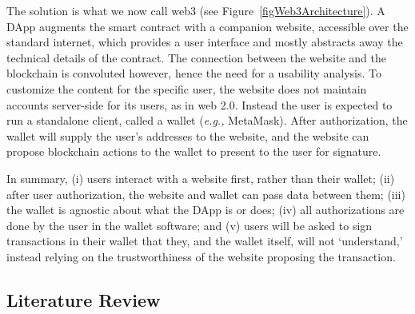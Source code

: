\documentclass[conference]{IEEEtran}
\begin{document}
The solution is what we now call web3 (see Figure~\ref{figWeb3Architecture}). A DApp augments the smart contract with a companion website, accessible over the standard internet, which provides a user interface and mostly abstracts away the technical details of the contract. The connection between the website and the blockchain is convoluted however, hence the need for a usability analysis. To customize the content for the specific user, the website does not maintain accounts server-side for its users, as in web 2.0. Instead the user is expected to run a standalone client, called a wallet (\textit{e.g.,} MetaMask). After authorization, the wallet will supply the user's addresses to the website, and the website can propose blockchain actions to the wallet to present to the user for signature. 


In summary, (i) users interact with a website first, rather than their wallet; (ii) after user authorization, the website and wallet can pass data between them; (iii) the wallet is agnostic about what the DApp is or does; (iv) all authorizations are done by the user in the wallet software; and (v) users will be asked to sign transactions in their wallet that they, and the wallet itself, will not `understand,' instead relying on the trustworthiness of the website proposing the transaction.


\subsection{Literature Review}
\end{document}
